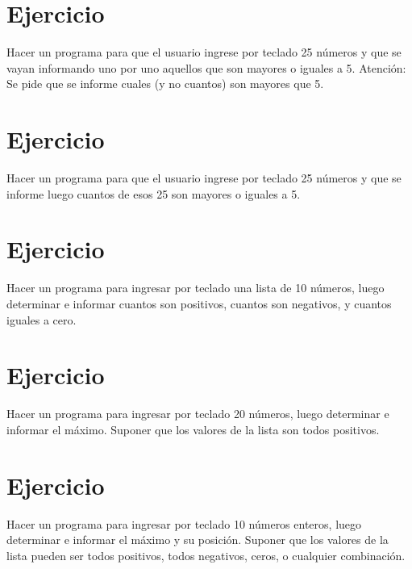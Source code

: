 \documentclass[12pt,a4paper,twoside]{article}
\begin{document}
\newpage

\section{Ejercicio }

\hspace*{1cm}Hacer un programa para que el usuario ingrese por teclado 25 números y que se vayan informando uno por uno aquellos que son mayores o iguales a 5.  Atención: Se pide que se informe cuales (y no cuantos) son mayores que 5. 

\newpage

\section{Ejercicio }

\hspace*{1cm}Hacer un programa para que el usuario ingrese por teclado 25 números y que se informe luego cuantos de esos 25 son mayores o iguales a 5. 

\newpage

\section{Ejercicio }

\hspace*{1cm}Hacer un programa para ingresar por teclado una lista de 10 números, luego determinar e  informar cuantos son positivos, cuantos son negativos, y cuantos iguales a cero. 

\newpage

\section{Ejercicio }

\hspace*{1cm}Hacer un programa para ingresar por teclado 20 números, luego determinar e informar el máximo. Suponer que los valores de la lista son todos positivos. 

\newpage

\section{Ejercicio }

\hspace*{1cm}Hacer un programa para ingresar por teclado 10 números enteros, luego determinar e informar el máximo y su posición. Suponer que los valores de la lista pueden ser todos positivos, todos negativos, ceros, o cualquier combinación.
\end{document}
